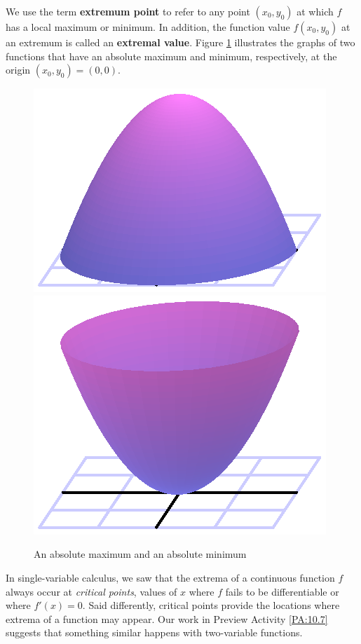 We use the term {\bf extremum point} to refer to any point $(x_0,y_0)$ at which $f$ has a local maximum or minimum.  In addition, the function value
          $f(x_0,y_0)$ at an extremum is called an {\bf extremal value}.  Figure \ref{F:10.7.extrema} illustrates the graphs of two functions
that have an absolute maximum and minimum, respectively, at the origin
$(x_0,y_0) = (0,0)$.   

\begin{figure}[ht]
  \begin{center}
    \includegraphics{figures/zis4r2.eps}
    \hspace*{20pt}
    \includegraphics{figures/zisr2.eps}
  \end{center}
  \caption{An absolute maximum and an absolute minimum}
  \label{F:10.7.extrema}
\end{figure}
    
In single-variable calculus, we saw that the extrema of a continuous function $f$ always occur at {\em critical points}, values of $x$ where $f$ fails to be differentiable or where $f'(x) = 0$.  Said differently, critical points provide the locations where extrema of a function may appear.  Our work in Preview Activity \ref{PA:10.7} suggests that something similar happens with two-variable functions.

